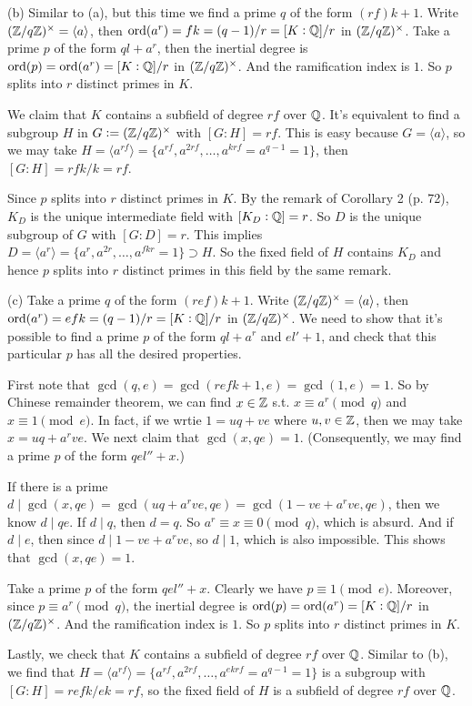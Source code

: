 \documentclass[../Marcus.tex]{subfiles}
\begin{document}
(b) Similar to (a), but this time we find a prime $q$ of the form $(rf)k+1$. Write $(\mathbb{Z}/q\mathbb{Z})^\times=\langle a\rangle$, then $\operatorname{ord}(a^r)=fk=(q-1)/r=[K:\mathbb{Q}]/r$ in $(\mathbb{Z}/q\mathbb{Z})^\times$. Take a prime $p$ of the form $ql+a^r$, then the inertial degree is $\operatorname{ord}(p)=\operatorname{ord}(a^r)=[K:\mathbb{Q}]/r$ in $(\mathbb{Z}/q\mathbb{Z})^\times$. And the ramification index is $1$. So $p$ splits into $r$ distinct primes in $K$.

We claim that $K$ contains a subfield of degree $rf$ over $\mathbb{Q}$. It's equivalent to find a subgroup $H$ in $G:=(\mathbb{Z}/q\mathbb{Z})^\times$ with $[G:H]=rf$. This is easy because $G=\langle a\rangle$, so we may take $H=\langle a^{rf}\rangle=\{a^{rf},a^{2rf},\ldots,a^{krf}=a^{q-1}=1\}$, then $[G:H]=rfk/k=rf$.

Since $p$ splits into $r$ distinct primes in $K$. By the remark of Corollary 2 (p. 72), $K_D$ is the unique intermediate field with $[K_D:\mathbb{Q}]=r$. So $D$ is the unique subgroup of $G$ with $[G:D]=r$. This implies $D=\langle a^r\rangle=\{a^r,a^{2r},\ldots,a^{fkr}=1\}\supset H$. So the fixed field of $H$ contains $K_D$ and hence $p$ splits into $r$ distinct primes in this field by the same remark.

(c) Take a prime $q$ of the form $(ref)k+1$. Write $(\mathbb{Z}/q\mathbb{Z})^\times=\langle a\rangle$, then $\operatorname{ord}(a^r)=efk=(q-1)/r=[K:\mathbb{Q}]/r$ in $(\mathbb{Z}/q\mathbb{Z})^\times$. We need to show that it's possible to find a prime $p$ of the form $ql+a^r$ and $el'+1$, and check that this particular $p$ has all the desired properties.

First note that $\gcd(q,e)=\gcd(refk+1,e)=\gcd(1,e)=1$. So by Chinese remainder theorem, we can find $x\in\mathbb{Z}$ s.t. $x\equiv a^r\pmod{q}$ and $x\equiv 1\pmod{e}$. In fact, if we wrtie $1=uq+ve$ where $u,v\in\mathbb{Z}$, then we may take $x=uq+a^rve$. We next claim that $\gcd(x,qe)=1$. (Consequently, we may find a prime $p$ of the form $qel''+x$.)

If there is a prime $d\mid\gcd(x,qe)=\gcd(uq+a^rve,qe)=\gcd(1-ve+a^rve,qe)$, then we know $d\mid qe$. If $d\mid q$, then $d=q$. So $a^r\equiv x\equiv 0 \pmod{q}$, which is absurd. And if $d\mid e$, then since $d\mid 1-ve+a^rve$, so $d\mid 1$, which is also impossible. This shows that $\gcd(x,qe)=1$.

Take a prime $p$ of the form $qel''+x$. Clearly we have $p\equiv 1\pmod{e}$. Moreover, since $p\equiv a^r\pmod{q}$, the inertial degree is $\operatorname{ord}(p)=\operatorname{ord}(a^r)=[K:\mathbb{Q}]/r$ in $(\mathbb{Z}/q\mathbb{Z})^\times$. And the ramification index is $1$. So $p$ splits into $r$ distinct primes in $K$.

Lastly, we check that $K$ contains a subfield of degree $rf$ over $\mathbb{Q}$. Similar to (b), we find that $H=\langle a^{rf}\rangle=\{a^{rf},a^{2rf},\ldots,a^{ekrf}=a^{q-1}=1\}$ is a subgroup with $[G:H]=refk/ek=rf$, so the fixed field of $H$ is a subfield of degree $rf$ over $\mathbb{Q}$.
\end{document}
